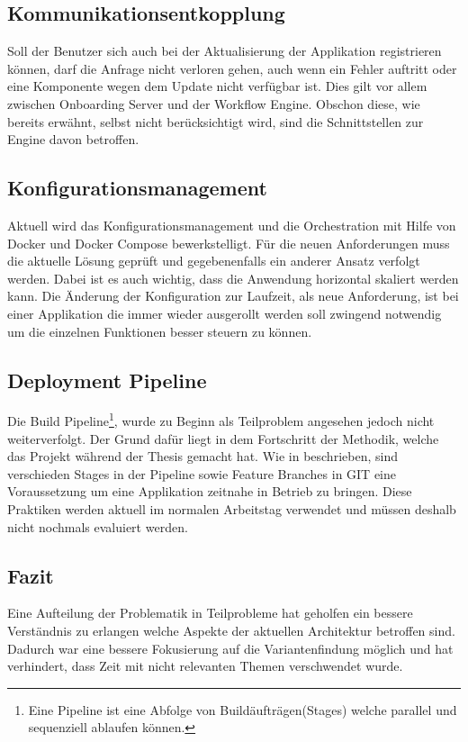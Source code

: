 \subsection{Kommunikationsentkopplung}

Soll der Benutzer sich auch bei der Aktualisierung der Applikation registrieren können, darf die Anfrage nicht verloren gehen, auch wenn ein Fehler auftritt oder eine Komponente wegen dem Update nicht verfügbar ist. Dies gilt vor allem zwischen Onboarding Server und der Workflow Engine. Obschon diese, wie bereits erwähnt, selbst nicht berücksichtigt wird, sind die Schnittstellen zur Engine davon betroffen.

\subsection{Konfigurationsmanagement}

Aktuell wird das Konfigurationsmanagement und die Orchestration mit Hilfe von Docker und Docker Compose bewerkstelligt. Für die neuen Anforderungen muss die aktuelle Lösung geprüft und gegebenenfalls ein anderer Ansatz verfolgt werden. Dabei ist es auch wichtig, dass die Anwendung horizontal skaliert werden kann. Die Änderung der Konfiguration zur Laufzeit, als neue Anforderung, ist bei einer Applikation die immer wieder ausgerollt werden soll zwingend notwendig um die einzelnen Funktionen besser steuern zu können.

\subsection{Deployment Pipeline}

Die Build Pipeline\footnote{Eine Pipeline ist eine Abfolge von Buildäufträgen(Stages) welche parallel und sequenziell ablaufen können. }, wurde zu Beginn als Teilproblem angesehen jedoch nicht weiterverfolgt. Der Grund dafür liegt in dem Fortschritt der Methodik, welche das Projekt während der Thesis gemacht hat. Wie in \cite{atlassiancd} beschrieben, sind verschieden Stages in der Pipeline sowie Feature Branches in GIT eine Voraussetzung um eine Applikation zeitnahe in Betrieb zu bringen. Diese Praktiken werden aktuell im normalen Arbeitstag verwendet und müssen deshalb nicht nochmals evaluiert werden.

\subsection{Fazit}

Eine Aufteilung der Problematik in Teilprobleme hat geholfen ein bessere Verständnis zu erlangen welche Aspekte der aktuellen Architektur betroffen sind. Dadurch war eine bessere Fokusierung auf die Variantenfindung möglich und hat verhindert, dass Zeit mit nicht relevanten Themen verschwendet wurde.

